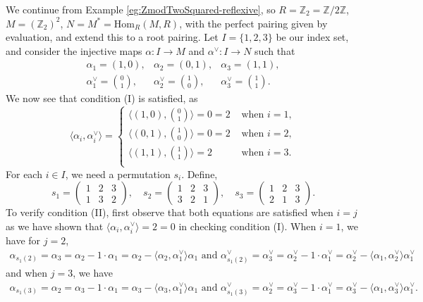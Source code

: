 \begin{example}
    \label{eg:eg:ZmodTwoSquared-perf-pairing}
    We continue from Example \ref{eg:ZmodTwoSquared-reflexive}, so $R=\mathbb{Z}_2 = \mathbb{Z}/2\mathbb{Z}$, $M=(\mathbb{Z}_2)^2$, $N=M^*=\mathrm{Hom}_{R}(M,R)$, with the perfect pairing given by evaluation, and extend this to a root pairing.
    Let $I=\{1,2,3\}$ be our index set, and consider the injective maps $\alpha:I\to M$ and $\alpha^\vee:I\to N$ such that
    \begin{equation*}
        \begin{array}{ccc}
            \alpha_1 = (1,0), & \alpha_2 = (0,1), & \alpha_3 = (1,1), \\
            \alpha^\vee_1 = {0\choose 1}, & \alpha^\vee_2 = {1\choose 0}, &\alpha^\vee_3 = {1\choose 1}.
        \end{array}
    \end{equation*}
    We now see that condition (I) is satisfied, as
    \begin{equation*}
        \langle\alpha_i,\alpha_i^\vee\rangle = \begin{cases}\langle (1,0),{0\choose 1} \rangle =0 = 2 &\text{ when } i=1,\\\langle (0,1),{1\choose 0} \rangle =0 = 2 &\text{ when } i=2,\\\langle (1,1),{1\choose 1} \rangle = 2 &\text{ when } i=3.\\
        \end{cases}
    \end{equation*}
    For each $i\in I$, we need a permutation $s_i$. Define,
    $$s_1=\begin{pmatrix}
        1&2 &3 \\ 1 &3 &2
    \end{pmatrix},\quad
    s_2=\begin{pmatrix}
        1&2 &3 \\ 3 &2 &1
    \end{pmatrix},\quad
    s_3=\begin{pmatrix}
        1&2 &3 \\ 2 &1 &3
    \end{pmatrix}.$$
    To verify condition (II), first observe that both equations are satisfied when $i=j$ as we have shown that $\langle\alpha_i,\alpha_i^\vee\rangle=2=0$ in checking condition (I).
    When $i=1$, we have for $j=2$,
    \begin{align*}
        \alpha_{s_1(2)} = \alpha_3 = \alpha_2 - 1\cdot\alpha_1=  \alpha_2 - \langle\alpha_2,\alpha_1^\vee\rangle\alpha_1 \text{ and }
            \alpha_{s_1(2)}^\vee = \alpha_3^\vee = \alpha_2^\vee -1\cdot \alpha_1^\vee= \alpha_2^\vee - \langle\alpha_1,\alpha^\vee_2\rangle\alpha_1^\vee
    \end{align*}
    and when $j=3$, we have
    \begin{align*}
        \alpha_{s_1(3)} = \alpha_2 = \alpha_3 - 1\cdot\alpha_1=  \alpha_3 - \langle\alpha_3,\alpha_1^\vee\rangle\alpha_1 \text{ and }
            \alpha_{s_1(3)}^\vee = \alpha_2^\vee = \alpha_3^\vee -1\cdot \alpha_1^\vee= \alpha_3^\vee - \langle\alpha_1,\alpha^\vee_3\rangle\alpha_1^\vee.
    \end{align*}
    

\end{example}
